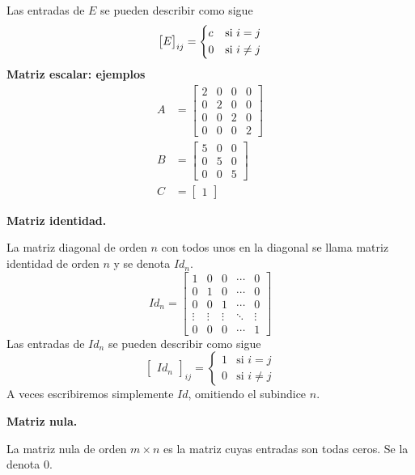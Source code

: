 \documentclass{article}
\theoremstyle{definition}
\theoremstyle{definition}
\theoremstyle{remark}
\begin{document}
Las entradas de $E$ se pueden describir como sigue \[
  \begin{bmatrix}E\end{bmatrix}_{ij} = \begin{dcases}
   c & \text{si }  i = j  \\
0 & \text{si } i \neq j \end{dcases}
\]
\textbf{Matriz escalar: ejemplos} \[
  \begin{aligned}
    A&=\begin{bmatrix} 2 & 0 & 0 & 0 \\ 0 & 2 & 0 & 0 \\ 0 & 0 & 2 & 0 \\ 0 & 0 & 0 & 2 \end{bmatrix} \\
    B&= \begin{bmatrix} 5 & 0 & 0 \\ 0 & 5 & 0 \\ 0 & 0 & 5 \end{bmatrix} \\
    C&= \begin{bmatrix} 1 \end{bmatrix}
  \end{aligned}
\]
\begin{center}
\textbf{Matriz identidad.}
\end{center}
La matriz diagonal de orden $n$ con todos unos en la diagonal se llama matriz identidad de orden $n$ y se denota $Id_n$.\[
  Id_n=\begin{bmatrix} 1 & 0 & 0 & \cdots & 0 \\
    0 & 1 & 0 & \cdots & 0 \\
    0 & 0 & 1 & \cdots & 0 \\
    \vdots & \vdots & \vdots & \ddots & \vdots \\
    0 & 0 & 0 & \cdots & 1
  \end{bmatrix}
    \]
    Las entradas de $Id_n$ se pueden describir como sigue \[
    \begin{bmatrix}Id_n\end{bmatrix}_{ij} = \begin{cases} 1 & \text{si } i = j \\
    0 & \text{si } i \neq j 
  \end{cases}
  \]
  A veces escribiremos simplemente $Id$, omitiendo el subindice $n$.
\begin{center}
\textbf{Matriz nula.}
\end{center}
La matriz nula de orden $m \times n$ es la matriz cuyas entradas son todas ceros. Se la denota $0$.
\end{document}
